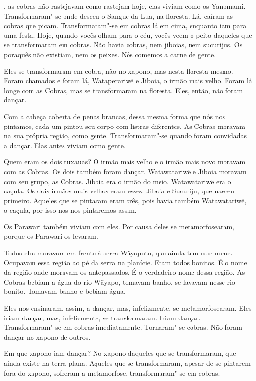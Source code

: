  

, as cobras não rastejavam como rastejam hoje, elas
viviam como os Yanomami. Transformaram"-se onde desceu o Sangue da Lua,
na floresta. Lá, caíram as cobras que picam. Transformaram"-se em cobras
lá em cima, enquanto iam para uma festa. Hoje, quando vocês olham para o
céu, vocês veem o peito daqueles que se transformaram em cobras. Não
havia cobras, nem jiboias, nem sucurijus. Os poraquês não existiam, nem
os peixes. Nós comemos a carne de gente.

Eles se transformaram em cobra, não no xapono, mas nesta floresta mesmo.
Foram chamados e foram lá, Wataperariwë e Jiboia, o irmão mais velho.
Foram lá longe com as Cobras, mas se transformaram na floresta. Eles,
então, não foram dançar. 

Com a cabeça coberta de penas brancas, dessa mesma forma que nós nos
pintamos, cada um pintou seu corpo com listras diferentes. As Cobras
moravam na sua própria região, como gente. Transformaram"-se quando
foram convidadas a dançar. Elas antes viviam como gente. 

Quem eram os dois tuxauas? O irmão mais velho e o irmão mais novo
moravam com as Cobras. Os dois também foram dançar. Watawatariwë e
Jiboia moravam com seu grupo, as Cobras. Jiboia era o irmão do meio.
Watawatariwë era o caçula. Os dois irmãos mais velhos eram esses: Jiboia
e Sucuriju, que nasceu primeiro. Aqueles que se pintaram eram três, pois
havia também Watawatariwë, o caçula, por isso nós nos pintaremos assim. 

Os Parawari também viviam com eles. Por causa deles se metamorfosearam,
porque os Parawari os levaram. 

Todos eles moravam em frente à serra Wãyapoto, que ainda tem esse nome.
Ocupavam essa região ao pé da serra na planície. Eram todos bonitos. É o
nome da região onde moravam os antepassados. É o verdadeiro nome dessa
região. As Cobras bebiam a água do rio Wãyapo, tomavam banho, se lavavam
nesse rio bonito. Tomavam banho e bebiam água. 

Eles nos ensinaram, assim, a dançar, mas, infelizmente, se
metamorfosearam. Eles iriam dançar, mas, infelizmente, se transformaram.
Iriam dançar. Transformaram"-se em cobras imediatamente. Tornaram"-se
cobras. Não foram dançar no xapono de outros. 

Em que xapono iam dançar? No xapono daqueles que se transformaram, que ainda existe na terra plana. Aqueles que se transformaram, apesar de se
pintarem fora do xapono, sofreram a metamorfose, transformaram"-se em
cobras. 

